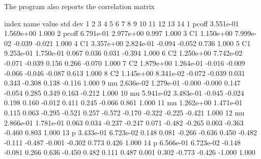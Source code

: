 The program also reports the correlation matrix
\begin{tinycode}

 index   name    value     std dev     1     2      3      4      5      6      7      8      9     10     11     12     13     14 
     1   pcoff  3.551e-01 1.569e+00  1.000
    2   pcoff  6.791e-01 2.977e+00  0.997  1.000
    3   C1     1.150e+00 7.999e-02 -0.039 -0.021  1.000
    4   C1     3.357e+00 2.824e-01 -0.094 -0.052  0.736  1.000
    5   C1     9.253e-01 1.750e-01  0.067  0.036  0.031 -0.394  1.000
    6   C2     1.250e+00 7.742e-02 -0.071 -0.039  0.156  0.266 -0.070  1.000
    7   C2     1.879e+00 1.264e-01 -0.016 -0.009 -0.066 -0.046 -0.087  0.613  1.000
    8   C2     1.145e+00 8.341e-02 -0.072 -0.039  0.031  0.343 -0.308  0.138 -0.116  1.000
    9   mu     2.636e-02 1.279e-01 -0.000 -0.000  0.147 -0.054  0.285  0.349  0.163 -0.212  1.000
   10   mu     5.941e-02 3.483e-01 -0.045 -0.024  0.198  0.160 -0.012  0.411  0.245 -0.066  0.861  1.000
   11   mu     1.262e+00 1.471e-01  0.115  0.063 -0.295 -0.521  0.257 -0.572 -0.170 -0.322 -0.225 -0.421  1.000
   12   mu     2.866e-01 1.781e-01  0.063  0.034 -0.237 -0.247  0.071 -0.482 -0.265  0.003 -0.363 -0.460  0.803  1.000
   13   p      3.433e-01 6.723e-02  0.148  0.081 -0.266 -0.636  0.450 -0.482 -0.111 -0.487 -0.001 -0.302  0.773  0.426  1.000
   14   p      6.566e-01 6.723e-02 -0.148 -0.081  0.266  0.636 -0.450  0.482  0.111  0.487  0.001  0.302 -0.773 -0.426 -1.000  1.000
\end{tinycode}
